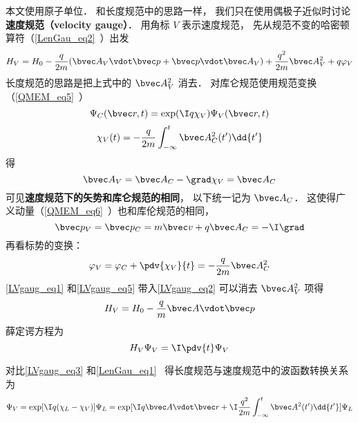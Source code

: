

本文使用原子单位． 和长度规范中的思路一样， 我们只在使用偶极子近似时讨论\textbf{速度规范（velocity gauge）}． 用角标 $V$ 表示速度规范， 先从规范不变的哈密顿算符（\autoref{LenGau_eq2}~）出发
\begin{equation}\label{LVgaug_eq2}
H_V = H_0 - \frac{q}{2m} (\bvec A_V \vdot \bvec p + \bvec p \vdot \bvec A_V)
+ \frac{q^2}{2m} \bvec A_V^2 + q \varphi_V
\end{equation}
长度规范的思路是把上式中的 $\bvec A_V^2$ 消去． 对库仑规范使用规范变换（\autoref{QMEM_eq5}~）
\begin{equation}\label{LVgaug_eq3}
\Psi_C(\bvec r, t) = \exp(\I q\chi_V)\Psi_V(\bvec r, t)
\end{equation}
\begin{equation}\label{LVgaug_eq4}
\chi_V(t) = -\frac{q}{2m} \int_{-\infty}^t \bvec A_C^2(t') \dd{t'}
\end{equation}
得
\begin{equation}\label{LVgaug_eq1}
\bvec A_V = \bvec A_C - \grad \chi_V = \bvec A_C
\end{equation}
可见\textbf{速度规范下的矢势和库仑规范的相同}， 以下统一记为 $\bvec A_C$． 这使得广义动量（\autoref{QMEM_eq6}~）也和库伦规范的相同， 
\begin{equation}
\bvec p_V = \bvec p_C =  m \bvec v + q\bvec A_{C} = -\I \grad
\end{equation}
再看标势的变换：
\begin{equation}\label{LVgaug_eq5}
\varphi_V = \varphi_C + \pdv{\chi_V}{t} = - \frac{q}{2m} \bvec A_C^2
\end{equation}
\autoref{LVgaug_eq1} 和\autoref{LVgaug_eq5} 带入\autoref{LVgaug_eq2} 可以消去 $\bvec A_V^2$ 项得
\begin{equation}
H_V = H_0 - \frac{q}{m} \bvec A \vdot \bvec p
\end{equation}
薛定谔方程为
\begin{equation}
H_V \Psi_V = \I \pdv{t} \Psi_V
\end{equation}


对比\autoref{LVgaug_eq3} 和\autoref{LenGau_eq1}~ 得长度规范与速度规范中的波函数转换关系为
\begin{equation}
\Psi_V = \exp[\I q(\chi_L - \chi_V)]\Psi_L = \exp[\I q \bvec A\vdot \bvec r + \I\frac{q^2}{2m}\int_{-\infty}^t \bvec A^2(t')\dd{t'}] \Psi_L
\end{equation}
